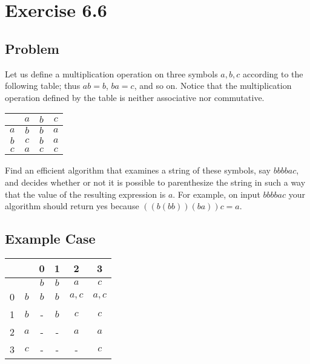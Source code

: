 \documentclass[12pt, letterpaper]{article}
\begin{document}
\newcommand{\pluseq}{\mathrel{+}=}

\section{Exercise 6.6}

\subsection{Problem}

Let us define a multiplication operation on three symbols \(a, b, c\) according to the following table; thus \(ab = b\), \(ba = c\), and so on. Notice that the multiplication operation defined by the table is neither associative nor commutative.

\begin{center}
\begin{tabular}{|c|ccc|}
    \hline
    & \(a\) & \(b\) & \(c\) \\
    \hline
    \(a\) & \(b\) & \(b\) & \(a\) \\
    \(b\) & \(c\) & \(b\) & \(a\) \\
    \(c\) & \(a\) & \(c\) & \(c\) \\
    \hline
\end{tabular}
\end{center}

Find an efficient algorithm that examines a string of these symbols, say \(bbbbac\), and decides whether or not it is possible to parenthesize the string in such a way that the value of the resulting expression is \(a\). For example, on input \(bbbbac\) your algorithm should return yes because \(((b(bb))(ba))c = a\).

\subsection{Example Case}

\begin{center}
  \begin{tabular}{ |c | c || c | c | c | c | }
    \hline 
    & & 0 & 1 & 2 & 3 \\
    \hline 
    & & \(b\) & \(b\) & \(a\) & \(c\) \\
    \hline 
    \hline 
    0 & \(b\) & \(b\) & \(b\) & \(a, c\) & \(a, c\) \\
    \hline 
    1 & \(b\) & - & \(b\) & \(c\) & \(c\) \\
    \hline 
    2 & \(a\) & - & - & \(a\) & \(a\) \\
    \hline 
    3 & \(c\) & - & - &  - & \(c\) \\
    \hline 
  \end{tabular}
\end{center}
\end{document}
